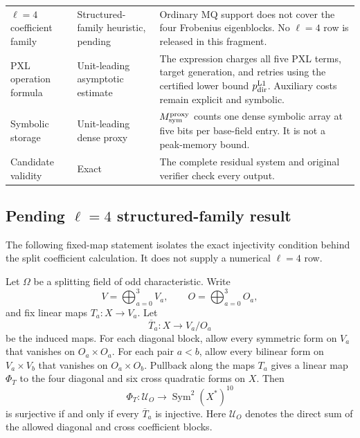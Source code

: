 \begin{center}
\begin{tabularx}{0.98\textwidth}{@{}>{\raggedright\arraybackslash}p{}>{\raggedright\arraybackslash}p{}X@{}}
$\ell=4$ coefficient family
& Structured-family heuristic, pending
& Ordinary MQ support does not cover the four Frobenius eigenblocks.  No $\ell=4$ row is released in this fragment.\\
PXL operation formula
& Unit-leading asymptotic estimate
& The expression charges all five PXL terms, target generation, and retries using the certified lower bound $p_{\rm dir}^{\rm L1}$.  Auxiliary costs remain explicit and symbolic.\\
Symbolic storage
& Unit-leading dense proxy
& $M_{\rm sym}^{\rm proxy}$ counts one dense symbolic array at five bits per base-field entry.  It is not a peak-memory bound.\\
Candidate validity
& Exact
& The complete residual system and original verifier check every output.\\
\bottomrule
\end{tabularx}
\end{center}

\subsection{Pending $\ell=4$ structured-family result}

The following fixed-map statement isolates the exact injectivity condition
behind the split coefficient calculation.  It does not supply a numerical
$\ell=4$ row.

\begin{theorem}
\label{thm:pxl-fixed-map-surjectivity}
Let $\Omega$ be a splitting field of odd characteristic.  Write
\[
 V=\bigoplus_{a=0}^{3}V_a,
 \qquad
 O=\bigoplus_{a=0}^{3}O_a,
\]
and fix linear maps $T_a:X\to V_a$.  Let
\[
 \overline T_a:X\longrightarrow V_a/O_a
\]
be the induced maps.  For each diagonal block, allow every symmetric form on
$V_a$ that vanishes on $O_a\times O_a$.  For each pair $a<b$, allow every
bilinear form on $V_a\times V_b$ that vanishes on
$O_a\times O_b$.  Pullback along the maps $T_a$ gives a linear map
$\Phi_T$ to the four diagonal and six cross quadratic forms on $X$.
Then
\[
 \Phi_T:\mathcal U_O\longrightarrow
 \operatorname{Sym}^2(X^*)^{10}
\]
is surjective if and only if every $\overline T_a$ is injective.  Here
$\mathcal U_O$ denotes the direct sum of the allowed diagonal and cross
coefficient blocks.
\end{theorem}

